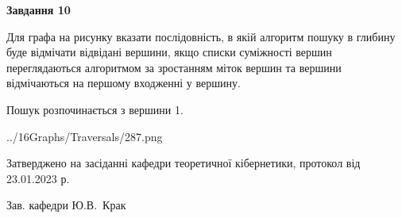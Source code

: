 \documentclass[12pt, ukrainian]{article}
\begin{document}
{\begin {large}
{\begin {center}\textbf{Завдання 10}\end {center}}\par
Для графа на рисунку вказати послідовність, в якій алгоритм пошуку в глибину буде відмічати відвідані вершини, якщо списки суміжності вершин переглядаються алгоритмом за зростанням міток вершин та вершини відмічаються на першому вход\-женні у вершину.\par
Пошук розпочинається з вершини 1.\par

\begin{center}
	{../16Graphs/Traversals/287.png}
\end{center}\par
\newpage


\end {large}
}
{\smallskip \begin {small} Затверджено на засіданні кафедри теоретичної кібернетики, протокол  від   23.01.2023 р.\par\smallskip\smallskip
{\parbox {6.5 cm}{Зав. кафедри \dotfill Ю.В.~Крак}} \end{small}}
\end{document}
